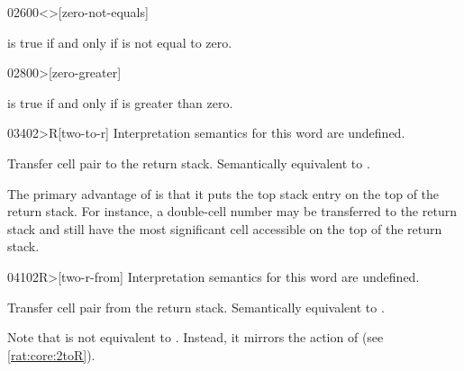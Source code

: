 \vspace*{-2.5ex}
\begin{worddef}[0ne]{0260}{0<>}[zero-not-equals]
\item {}

	 is true if and only if  is not equal to
	zero.
\end{worddef}

\vspace*{-2.5ex}
\begin{worddef}[0more]{0280}{0>}[zero-greater]
\item {}

	 is true if and only if  is greater than
	zero.
\end{worddef}

\vspace*{-2.5ex}
\begin{worddef}[2toR]{0340}{2>R}[two-to-r]
\interpret
	Interpretation semantics for this word are undefined.

\execute

	Transfer cell pair  to the return stack.
	Semantically equivalent to   .


	\begin{rationale} %
		The primary advantage of  is that it puts the top
		stack entry on the top of the return stack. For instance, a
		double-cell number may be transferred to the return stack and
		still have the most significant cell accessible on the top of
		the return stack.
	\end{rationale}
\end{worddef}


\begin{worddef}[2Rfrom]{0410}{2R>}[two-r-from]
\interpret
	Interpretation semantics for this word are undefined.

\execute

	Transfer cell pair  from the return stack.
	Semantically equivalent to   .


	\begin{rationale} %
		Note that  is not equivalent to  .
		Instead, it mirrors the action of 
		(see \ref{rat:core:2toR}).
	\end{rationale}
\end{worddef}


